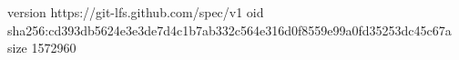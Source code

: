 version https://git-lfs.github.com/spec/v1
oid sha256:cd393db5624e3e3de7d4c1b7ab332c564e316d0f8559e99a0fd35253dc45c67a
size 1572960
